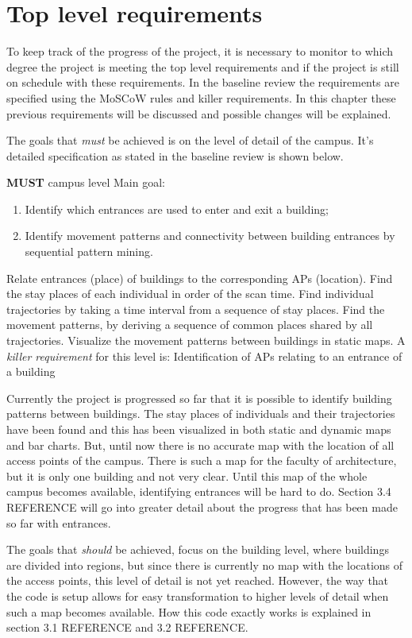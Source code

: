 \chapter{Top level requirements}
To keep track of the progress of the project, it is necessary to monitor to which degree the project is meeting the top level requirements and if the project is still on schedule with these requirements. In the baseline review the requirements are specified using the MoSCoW rules and killer requirements. In this chapter these previous requirements will be discussed and possible changes will be explained.

The goals that \textit{must} be achieved is on the level of detail of the campus. It’s detailed specification as stated in the baseline review is shown below. 

\textbf{MUST} campus level
Main goal: 
\begin{enumerate}
\item Identify which entrances are used to enter and exit a building;
\item Identify movement patterns and connectivity between building entrances by sequential pattern mining.
\end{enumerate}
Relate entrances (place) of buildings to the corresponding APs (location).
Find the stay places of each individual in order of the scan time.
Find individual trajectories by taking a time interval from a sequence of stay places.
Find the movement patterns, by deriving a sequence of common places shared by all trajectories.
Visualize the movement patterns between buildings in static maps.
A \textit{killer requirement} for this level is:
Identification of APs relating to an entrance of a building

Currently the project is progressed so far that it is possible to identify building patterns between buildings. The stay places of individuals and their trajectories have been found and this has been visualized in both static and dynamic maps and bar charts. But, until now there is no accurate map with the location of all access points of the campus. There is such a map for the faculty of architecture, but it is only one building and not very clear. Until this map of the whole campus becomes available, identifying entrances will be hard to do. Section 3.4 {REFERENCE} will go into greater detail about the progress that has been made so far with entrances. 

The goals that \textit {should} be achieved, focus on the building level, where buildings are divided into regions, but since there is currently no map with the locations of the access points, this level of detail is not yet reached. However, the way that the code is setup allows for easy transformation to higher levels of detail when such a map becomes available. How this code exactly works is explained in section 3.1 {REFERENCE} and 3.2 {REFERENCE}. 
